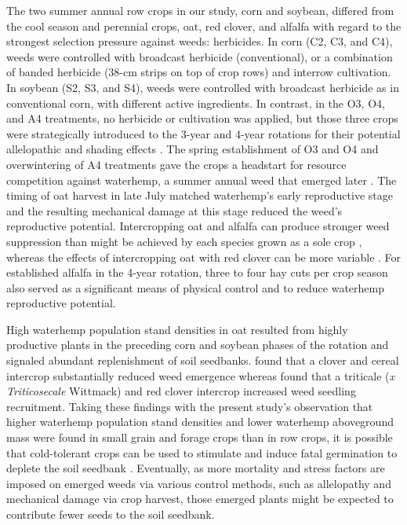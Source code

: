 \documentclass[utf8]{frontiersSCNS}
\begin{document}
The two summer annual row crops in our study, corn and soybean, differed from the cool season and perennial crops, oat, red clover, and alfalfa with regard to the strongest selection pressure against weeds: herbicides. In corn (C2, C3, and C4), weeds were controlled with broadcast herbicide (conventional), or a combination of banded herbicide (38-cm strips on top of crop rows) and interrow cultivation. In soybean (S2, S3, and S4), weeds were controlled with broadcast herbicide as in conventional corn, with different active ingredients. In contrast, in the O3, O4, and A4 treatments, no herbicide or cultivation was applied, but those three crops were strategically introduced to the 3-year and 4-year rotations for their potential allelopathic and shading effects \citep{liebmanCropRotationIntercropping1993, singhAllelopathicInteractionsAllelochemicals2003}. The spring establishment of O3 and O4 and overwintering of A4 treatments gave the crops a headstart for resource competition against waterhemp, a summer annual weed that emerged later \citep{hartzlerEffectCommonWaterhemp2004}. The timing of oat harvest in late July matched waterhemp's early reproductive stage \citep{buhlerRelativeEmergenceSequence2008, horakGrowthAnalysisFour2000} and the resulting mechanical damage at this stage reduced the weed's reproductive potential. Intercropping oat and alfalfa can produce stronger weed suppression than might be achieved by each species grown as a sole crop \citep{laniniFightWeedsIncrease1992}, whereas the effects of intercropping oat with red clover can be more variable \citep{samsonChoiceManagementCover1990}. For established alfalfa in the 4-year rotation, three to four hay cuts per crop season also served as a significant means of physical control and to reduce waterhemp reproductive potential.

High waterhemp population stand densities in oat resulted from highly productive plants in the preceding corn and soybean phases of the rotation and signaled abundant replenishment of soil seedbanks. \citet{dykeSuppressionCouchGrass1976} found that a clover and cereal intercrop substantially reduced weed emergence whereas \citet{heggenstallerSeasonalPatternsPostdispersal2006} found that a triticale (\emph{x Triticosecale} Wittmack) and red clover intercrop increased weed seedling recruitment. Taking these findings with the present study's observation that higher waterhemp population stand densities and lower waterhemp aboveground mass were found in small grain and forage crops than in row crops, it is possible that cold-tolerant crops can be used to stimulate and induce fatal germination to deplete the soil seedbank \citep{davisCroppingSystemEffects2003, gallandtEffectCovercroppingSystems2005}. Eventually, as more mortality and stress factors are imposed on emerged weeds via various control methods, such as allelopathy and mechanical damage via crop harvest, those emerged plants might be expected to contribute fewer seeds to the soil seedbank.
\end{document}
